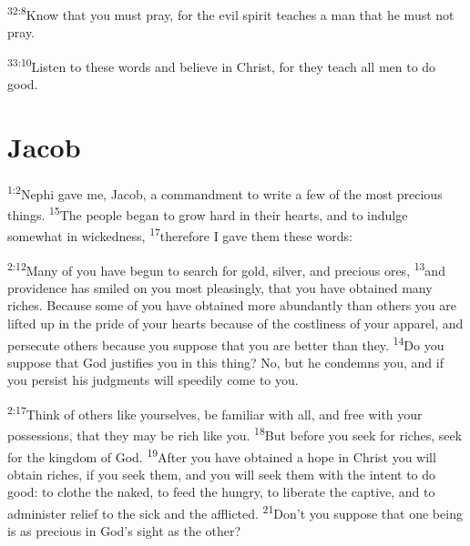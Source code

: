 \documentclass[openany,12pt,english]{book}
\newenvironment{para}{\par\pretolerance=100\tolerance=200\setlength{\emergencystretch}{0.6em}\relax}{\par}
\begin{document}
\begin{para}
    \textsuperscript{32:8}\thinspace{}Know that you must pray, for the evil spir\-it teaches a man that he must not pray.
\end{para}

\begin{para}
    \textsuperscript{33:10}\thinspace{}Lis\-ten to these words and be\-lieve in Christ, for they teach all men to do good.
\end{para}

\section*{Jacob}
\begin{para}
    \textsuperscript{1:2}\thinspace{}Nephi gave me, Jacob, a com\-mand\-ment to write a few of the most pre\-cious things.
    \textsuperscript{15}\thinspace{}The peo\-ple be\-gan to grow hard in their hearts, and to in\-dulge some\-what in wick\-ed\-ness,
    \textsuperscript{17}\thinspace{}there\-fore I gave them these words:
\end{para}

\bigskip{}

\begin{para}
    \textsuperscript{2:12}\thinspace{}Man\-y of you have be\-gun to search for gold, sil\-ver, and pre\-cious ores,
    \textsuperscript{13}\thinspace{}and prov\-i\-dence has smiled on you most pleas\-ing\-ly, that you have obtained man\-y rich\-es. Be\-cause some of you have obtained more a\-bun\-dant\-ly than others you are lifted up in the pride of your hearts be\-cause of the cost\-li\-ness of your ap\-par\-el, and per\-se\-cute others be\-cause you sup\-pose that you are bet\-ter than they. 
    \textsuperscript{14}\thinspace{}Do you sup\-pose that God justifies you in this thing? No, but he condemns you, and if you per\-sist his judgments will speed\-i\-ly come to you.
\end{para}

\begin{para}
    \textsuperscript{2:17}\thinspace{}Think of others like your\-selves, be fa\-mil\-iar with all, and free with your possessions, that they may be rich like you.
    \textsuperscript{18}\thinspace{}But be\-fore you seek for rich\-es, seek for the king\-dom of God.
    \textsuperscript{19}\thinspace{}Af\-ter you have obtained a hope in Christ you will ob\-tain rich\-es, if you seek them, and you will seek them with the in\-tent to do good: to clothe the na\-ked, to feed the hun\-gry, to lib\-er\-ate the cap\-tive, and to ad\-min\-is\-ter re\-lief to the sick and the afflicted.
    \textsuperscript{21}\thinspace{}Don't you sup\-pose that one be\-ing is as pre\-cious in God's sight as the oth\-er?
\end{para}
\end{document}

